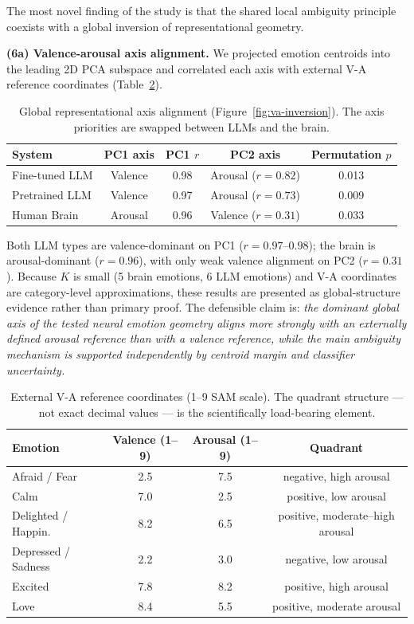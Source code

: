\documentclass{article}
\begin{document}
The most novel finding of the study is that the shared local ambiguity principle
coexists with a global inversion of representational geometry.

\textbf{(6a) Valence-arousal axis alignment.}
We projected emotion centroids into the leading 2D PCA subspace and correlated each
axis with external V-A reference coordinates (Table~\ref{tab:va-coords}).

\begin{table}[h]
\small
\centering
\begin{tabular}{lcccc}
\toprule
System & PC1 axis & PC1 $r$ & PC2 axis & Permutation $p$ \\
\midrule
Fine-tuned LLM  & Valence & 0.98 & Arousal ($r\!=\!0.82$) & 0.013 \\
Pretrained LLM  & Valence & 0.97 & Arousal ($r\!=\!0.73$) & 0.009 \\
Human Brain     & Arousal & 0.96 & Valence ($r\!=\!0.31$) & 0.033 \\
\bottomrule
\end{tabular}
\caption{Global representational axis alignment (Figure~\ref{fig:va-inversion}).
         The axis priorities are swapped between LLMs and the brain.}
\label{tab:va-alignment}
\end{table}

Both LLM types are valence-dominant on PC1 ($r\!=\!0.97$--$0.98$);
the brain is arousal-dominant ($r\!=\!0.96$), with only weak valence alignment on PC2
($r\!=\!0.31$).
Because $K$ is small (5 brain emotions, 6 LLM emotions) and V-A coordinates are
category-level approximations, these results are presented as global-structure evidence
rather than primary proof.
The defensible claim is: \emph{the dominant global axis of the tested neural emotion
geometry aligns more strongly with an externally defined arousal reference than with
a valence reference, while the main ambiguity mechanism is supported independently
by centroid margin and classifier uncertainty.}

\begin{table}[h]
\small
\centering
\begin{tabular}{lccc}
\toprule
Emotion & Valence (1--9) & Arousal (1--9) & Quadrant \\
\midrule
Afraid / Fear      & 2.5 & 7.5 & negative, high arousal \\
Calm               & 7.0 & 2.5 & positive, low arousal \\
Delighted / Happin.& 8.2 & 6.5 & positive, moderate--high arousal \\
Depressed / Sadness& 2.2 & 3.0 & negative, low arousal \\
Excited            & 7.8 & 8.2 & positive, high arousal \\
Love               & 8.4 & 5.5 & positive, moderate arousal \\
\bottomrule
\end{tabular}
\caption{External V-A reference coordinates (1--9 SAM scale).
         The quadrant structure --- not exact decimal values --- is the
         scientifically load-bearing element.}
\label{tab:va-coords}
\end{table}
\end{document}
